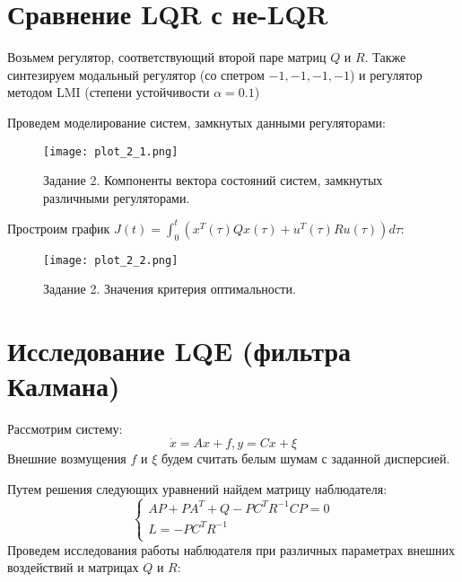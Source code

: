 \pagebreak

\section{Сравнение LQR с не-LQR}
Возьмем регулятор, соответствующий второй паре матриц $Q$ и $R$. Также синтезируем модальный регулятор
(со спетром {$-1,-1,-1,-1$}) и регулятор методом LMI (степени устойчивости $\alpha=0.1$)

Проведем моделирование систем, замкнутых данными регуляторами:
\begin{figure}[h]
    \centering
    \texttt{[image: plot\_2\_1.png]}
    \caption{\label{fig:The-caption-2}Задание 2. Компоненты вектора состояний систем, замкнутых различными регуляторами.}
\end{figure}

Простроим график $J(t) = \int_{0}^{t}(x^T(\tau)Qx(\tau)+u^T(\tau)Ru(\tau))d\tau$:
\begin{figure}[h]
    \centering
    \texttt{[image: plot\_2\_2.png]}
    \caption{\label{fig:The-caption-2}Задание 2. Значения критерия оптимальности.}
\end{figure}
\pagebreak

\section{Исследование LQE (фильтра Калмана)}
Рассмотрим систему:
\begin{equation}
    \dot{x} = Ax + f, y = Cx + \xi
\end{equation}
Внешние возмущения $f$ и $\xi$  будем считать белым шумам с заданной дисперсией.

Путем решения следующих уравнений найдем матрицу наблюдателя:
\begin{equation}
    \begin{cases}
        A P + P A^T + Q - PC^TR^{-1}CP = 0\\
        L = -PC^TR^{-1} \\
    \end{cases}
\end{equation}
Проведем исследования работы наблюдателя при различных параметрах внешних воздействий и матрицах $Q$ и $R$:

